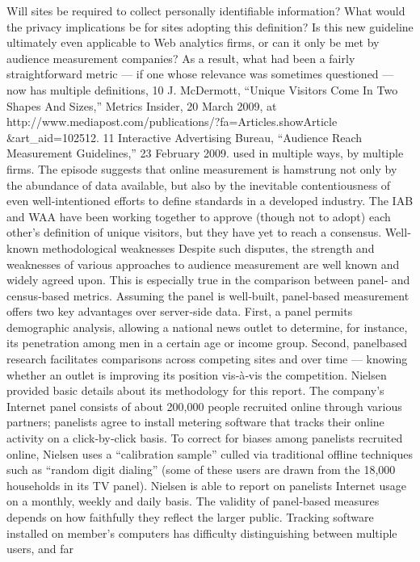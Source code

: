 Will sites be required to collect personally identifiable information? What
would the privacy implications be for sites adopting this definition? Is this
new guideline ultimately even applicable to Web analytics firms, or can it
only be met by audience measurement companies?
As a result, what had been a fairly straightforward metric — if one whose
relevance was sometimes questioned — now has multiple definitions,
10 J. McDermott, ``Unique Visitors Come In Two Shapes And Sizes,'' Metrics Insider,
20 March 2009, at http://www.mediapost.com/publications/?fa=Articles.showArticle
&art_aid=102512.
11 Interactive Advertising Bureau, ``Audience Reach Measurement Guidelines,'' 23
February 2009.
used in multiple ways, by multiple firms. The episode suggests that online
measurement is hamstrung not only by the abundance of data available,
but also by the inevitable contentiousness of even well‐intentioned efforts
to define standards in a developed industry. The IAB and WAA have been
working together to approve (though not to adopt) each other’s definition
of unique visitors, but they have yet to reach a consensus.
Well‐known methodological weaknesses
Despite such disputes, the strength and weaknesses of various approaches
to audience measurement are well known and widely agreed upon. This is
especially true in the comparison between panel‐ and census‐based
metrics.
Assuming the panel is well‐built, panel‐based measurement offers two
key advantages over server‐side data. First, a panel permits demographic
analysis, allowing a national news outlet to determine, for instance, its
penetration among men in a certain age or income group. Second, panelbased
research facilitates comparisons across competing sites and over
time — knowing whether an outlet is improving its position vis‐à‐vis the
competition.
Nielsen provided basic details about its methodology for this report. The
company’s Internet panel consists of about 200,000 people recruited online
through various partners; panelists agree to install metering software that
tracks their online activity on a click‐by‐click basis. To correct for biases
among panelists recruited online, Nielsen uses a ``calibration sample''
culled via traditional offline techniques such as ``random digit dialing''
(some of these users are drawn from the 18,000 households in its TV
panel). Nielsen is able to report on panelists Internet usage on a monthly,
weekly and daily basis.
The validity of panel‐based measures depends on how faithfully they
reflect the larger public. Tracking software installed on member’s
computers has difficulty distinguishing between multiple users, and far
